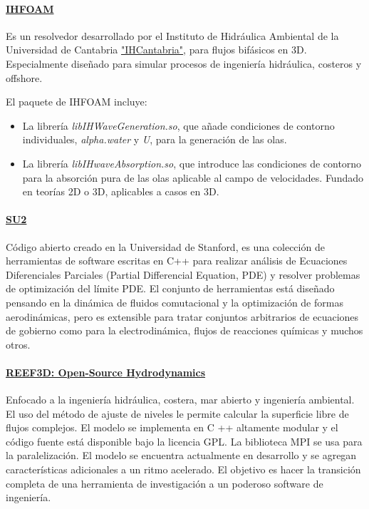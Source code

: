 \paragraph{\texorpdfstring{
\href{https://openfoamwiki.net/index.php/Contrib/IHFOAM}{IHFOAM}}{IHFOAM}}\label{header-n274}

Es un resolvedor desarrollado por el Instituto de Hidráulica Ambiental
de la Universidad de Cantabria
\href{http://www.ihcantabria.com/es/}{"IHCantabria"}, para flujos
bifásicos en 3D. Especialmente diseñado para simular procesos de
ingeniería hidráulica, costeros y offshore.

El paquete de IHFOAM incluye:

\begin{itemize}
\item
  La librería \emph{libIHWaveGeneration.so}, que añade condiciones de
  contorno individuales, \emph{alpha.water} y \emph{U}, para la
  generación de las olas.
\item
  La librería \emph{libIHwaveAbsorption.so}, que introduce las
  condiciones de contorno para la absorción pura de las olas aplicable
  al campo de velocidades. Fundado en teorías 2D o 3D, aplicables a
  casos en 3D.
\end{itemize}

\paragraph{\texorpdfstring{
\href{https://www.cfd-online.com/Wiki/SU2}{SU2}}{SU2}}\label{header-n286}

Código abierto creado en la Universidad de Stanford, es una colección de
herramientas de software escritas en C++ para realizar análisis de
Ecuaciones Diferenciales Parciales (Partial Differencial Equation, PDE)
y resolver problemas de optimización del límite PDE. El conjunto de
herramientas está diseñado pensando en la dinámica de fluidos
comutacional y la optimización de formas aerodinámicas, pero es
extensible para tratar conjuntos arbitrarios de ecuaciones de gobierno
como para la electrodinámica, flujos de reacciones químicas y muchos
otros.

\paragraph{\texorpdfstring{
\href{https://reef3d.wordpress.com/}{REEF3D: Open-Source
Hydrodynamics}}{REEF3D: Open-Source Hydrodynamics}}\label{header-n289}

Enfocado a la ingeniería hidráulica, costera, mar abierto y ingeniería
ambiental. El uso del método de ajuste de niveles le permite calcular la
superficie libre de flujos complejos. El modelo se implementa en C ++
altamente modular y el código fuente está disponible bajo la licencia
GPL. La biblioteca MPI se usa para la paralelización. El modelo se
encuentra actualmente en desarrollo y se agregan características
adicionales a un ritmo acelerado. El objetivo es hacer la transición
completa de una herramienta de investigación a un poderoso software de
ingeniería.

